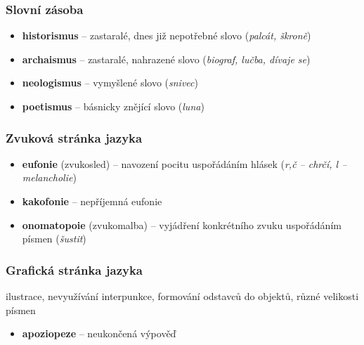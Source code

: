 \subsubsection{Slovní zásoba}
\begin{itemize}
\item[] \textbf{historismus} -- zastaralé, dnes již nepotřebné slovo (\textit{palcát, škroně})
\item[] \textbf{archaismus} -- zastaralé, nahrazené slovo (\textit{biograf, lučba, dívaje se})
\item[] \textbf{neologismus} -- vymyšlené slovo (\textit{snivec})
\item[] \textbf{poetismus} -- básnicky znějící slovo (\textit{luna})
\end{itemize}

\subsubsection{Zvuková stránka jazyka}
\begin{itemize}
\item[] \textbf{eufonie} (zvukosled) -- navození pocitu uspořádáním hlásek (\textit{r,č – chrčí, l – melancholie})
\item[] \textbf{kakofonie} -- nepříjemná eufonie
\item[] \textbf{onomatopoie} (zvukomalba) -- vyjádření konkrétního zvuku uspořádáním písmen (\textit{šustit})
\end{itemize}

\subsubsection{Grafická stránka jazyka}
ilustrace, nevyužívání interpunkce, formování odstavců do objektů, různé velikosti písmen
\begin{itemize}
\item[] \textbf{apoziopeze} -- neukončená výpověď
\end{itemize}

